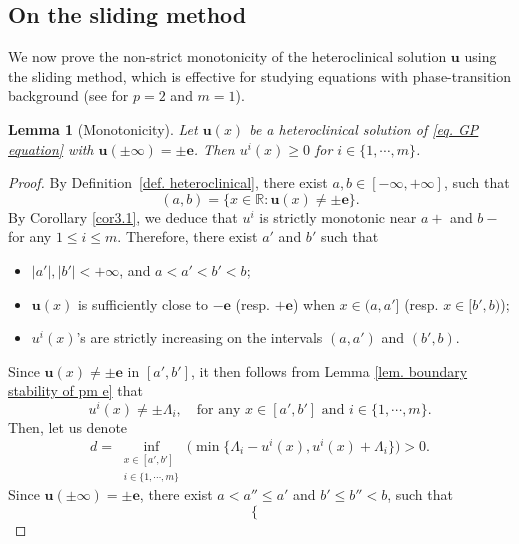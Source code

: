 \documentclass[11pt,twoside,reqno]{amsart}
\newtheorem{lemma}{Lemma}[section]
\numberwithin{equation}{section}
\begin{document}
\subsection{On the sliding method}
We now prove the non-strict monotonicity of the heteroclinical solution $\mathbf{u}$ using the sliding method, which is effective for studying equations with phase-transition background (see \cite{BN1991} for $p=2$ and $m=1$).

\begin{lemma}[Monotonicity]\label{le5.4}
Let $\mathbf{u}(x)$ be a heteroclinical solution of \eqref{eq. GP equation} with $\mathbf{u}(\pm\infty)=\pm\mathbf{e}$. Then $u^{i}(x)\geq 0$ for $i\in\{1,\cdots,m\}$.
\end{lemma}
\begin{proof}
By Definition~\ref{def. heteroclinical}, there exist $a,b\in[-\infty,+\infty]$, such that
\begin{equation*}
    (a,b)=\{x\in\mathbb{R}:\mathbf{u}(x)\neq\pm\mathbf{e}\}.
\end{equation*}
By Corollary \ref{cor3.1}, we deduce that $u^i$ is strictly monotonic near $a+$ and $b-$ for any $1\leq i\leq m$. Therefore, there exist $a'$ and $b'$ such that
\begin{itemize}
    \item[(i)] $|a'|, |b'|<+\infty$, and $a<a'<b'<b$;
    \item[(ii)] $\mathbf{u}(x)$ is sufficiently close to $-\mathbf{e}$ (resp. $+\mathbf{e}$) when $x\in(a,a']$ (resp. $x\in[b',b)$);
    \item[(iii)] $u^i(x)$'s are strictly increasing on the intervals $(a, a')$ and $(b', b)$.
\end{itemize}
Since $\mathbf{u}(x)\neq\pm\mathbf{e}$ in $[a',b']$, it then follows from Lemma \ref{lem. boundary stability of pm e} that
\begin{equation*}
    u^i(x)\neq\pm \Lambda_i,\quad\mbox{for any }x\in[a',b']\mbox{ and }i\in\{1,\cdots,m\}.
\end{equation*}
Then, let us denote 
\begin{equation*}
    d=\inf_{\substack{x\in[a',b']\\i\in\{1,\cdots,m\}}}\Big(\min\big\{\Lambda_{i}-u^{i}(x), u^{i}(x)+\Lambda_{i}\big\}\Big)>0.
\end{equation*}
Since $\mathbf{u}(\pm\infty)=\pm\mathbf{e}$, there exist $a<a''\leq a'$ and $b'\leq b''<b$, such that
\begin{equation*}
    \begin{cases}

\end{cases}
\end{equation*}
\end{proof}
\end{document}
